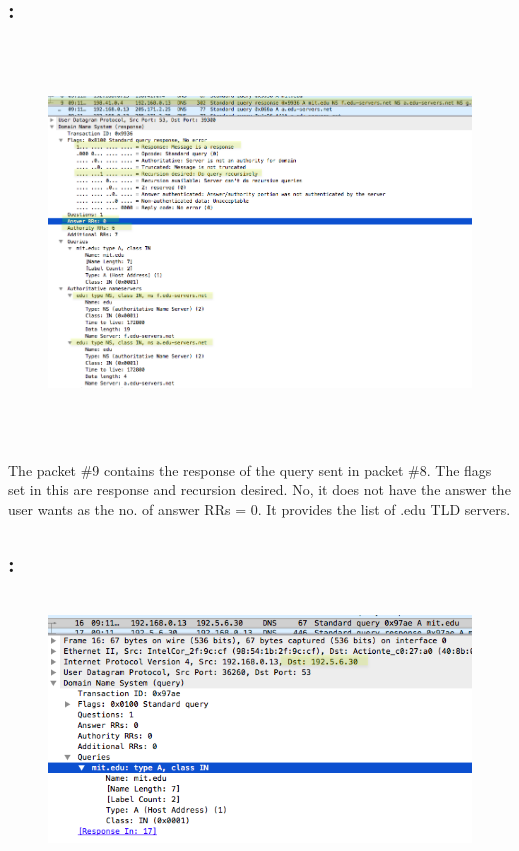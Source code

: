 \documentclass[]{report}
\begin{document}
\subsection{:}
\begin{figure}[H]
	\vspace{0pt}
	\includegraphics[height = 300pt, keepaspectratio]{Snapshots/q3/3_6.png}
\end{figure}

The packet \#9 contains the response of the query sent in packet \#8. The flags set in this are response and recursion desired. No, it does not have the answer the user wants as the no. of answer RRs = 0. It provides the list of .edu TLD servers. 
\subsection{:}
\begin{figure}[H]
	\vspace{0pt}
	\includegraphics[height = 200pt, keepaspectratio]{Snapshots/q3/3_7.png}
\end{figure}
\end{document}

